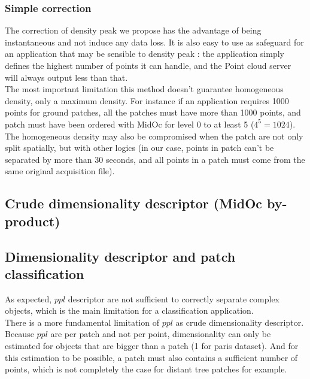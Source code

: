 		\subsubsection{Simple correction}
		The correction of density peak we propose has the advantage of being instantaneous and not induce any data loss.
		It is also easy to use as safeguard for an application that may be sensible to density peak : the application simply defines the highest number of points \per \cubic \meter it can handle, and the Point cloud server will always output less than that.
		\\
		The most important limitation this method doesn't guarantee homogeneous density, only a maximum density.
		For instance if an application requires 1000 points \per \cubic \meter for ground patches, all the patches must have more than 1000 points, and patch must have been ordered with MidOc for level 0 to at least 5 ($4^5=1024$). 
		The homogeneous density may also be compromised when the patch are not only split spatially, but with other logics (in our case, points in patch can't be separated by more than 30 seconds, and all points in a patch must come from the same original acquisition file).
		
	\subsection{Crude dimensionality descriptor (MidOc by-product)}	  
			 
			 
		
			     
		
			 
	 \subsection{Dimensionality descriptor and patch classification}
		 As expected, $ppl$ descriptor are  not sufficient to correctly separate complex objects, which is the main limitation for a classification application.
		 \\
		 There is a more fundamental limitation of $ppl$ as crude dimensionality descriptor. Because $ppl$ are per patch and not per point, dimensionality can only be estimated for objects that are bigger than a patch (1 \cubic \meter for paris dataset).
		 And for this estimation to be possible, a patch must also contains a sufficient number of points, which is not completely the case for distant tree patches for example.
	
